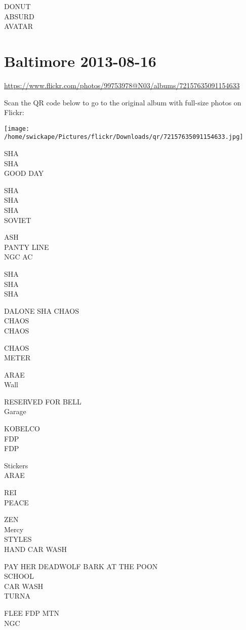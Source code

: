 \documentclass[10pt,letterpaper]{article}
\begin{document}
DONUT\\
ABSURD\\
AVATAR


\section*{Baltimore 2013-08-16}

\url{https://www.flickr.com/photos/99753978@N03/albums/72157635091154633}

Scan the QR code below to go to the original album with full-size photos on Flickr:

\texttt{[image: /home/swickape/Pictures/flickr/Downloads/qr/72157635091154633.jpg]}


SHA\\
SHA\\
GOOD DAY

SHA\\
SHA\\
SHA\\
SOVIET

ASH\\
PANTY LINE\\
NGC AC

SHA\\
SHA\\
SHA

DALONE SHA CHAOS\\
CHAOS\\
CHAOS

CHAOS\\
METER

ARAE\\
Wall

RESERVED FOR BELL\\
Garage

KOBELCO\\
FDP\\
FDP

Stickers\\
ARAE

REI\\
PEACE

ZEN\\
Mercy\\
STYLES\\
HAND CAR WASH

PAY HER DEADWOLF BARK AT THE POON\\
SCHOOL\\
CAR WASH\\
TURNA

FLEE FDP MTN\\
NGC
\end{document}
